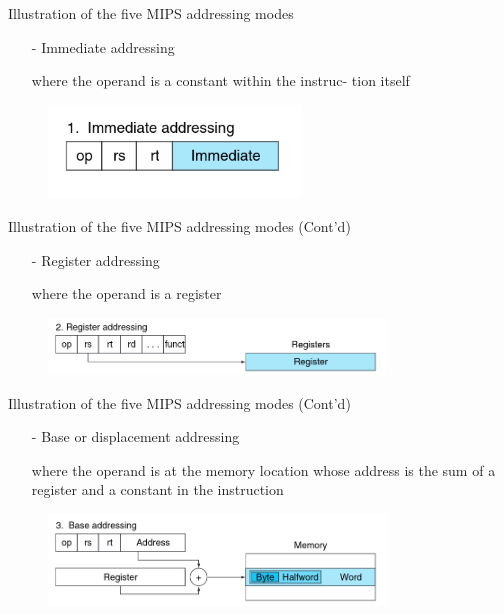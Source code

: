 \begin{frame}{Illustration of the five MIPS addressing modes}
\begin{itemize}
\item[-]  Immediate addressing

where the operand is a constant within the instruc-
tion itself 
\end{itemize}
\begin{figure}
\begin{center}
\includegraphics[width=0.6\textwidth, height=0.4\textheight]{docs/images/addr-1}
\end{center}
\end{figure}
\end{frame}

\begin{frame}{Illustration of the five MIPS addressing modes (Cont'd)}
\begin{itemize}
\item[-] Register addressing

where the operand is a register
\end{itemize}
    
\begin{figure}
\begin{center}
\includegraphics[width=0.8\textwidth, height=0.25\textheight]{docs/images/addr-2}
\end{center}
\end{figure}
\end{frame}


\begin{frame}{Illustration of the five MIPS addressing modes (Cont'd)}
\begin{itemize}
\item[-] Base or displacement addressing

where the operand is at the memory location whose address is the sum of a register and a constant in the instruction
\end{itemize}

\begin{figure}
\begin{center}
\includegraphics[width=0.8\textwidth, height=0.4\textheight]{docs/images/addr-3}
\end{center}
\end{figure}
\end{frame}

